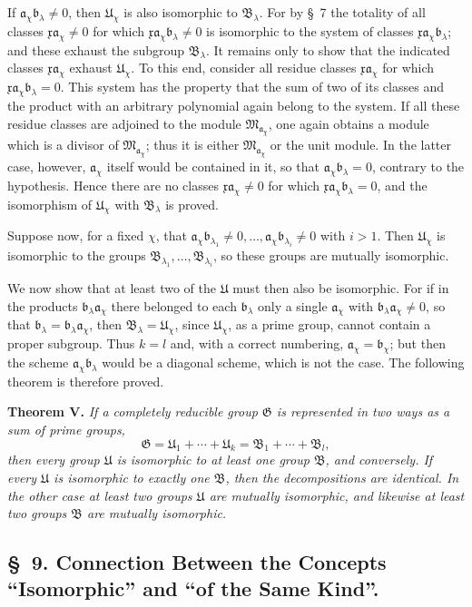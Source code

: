 \documentclass[11pt]{article}
\newcommand{\mM}{\mathfrak{M}}
\newcommand{\mG}{\mathfrak{G}}
\newcommand{\mB}{\mathfrak{B}}
\newcommand{\ma}{\mathfrak{a}}
\newcommand{\mb}{\mathfrak{b}}
\newcommand{\mx}{\mathfrak{x}}
\newcommand{\mU}{\mathfrak{U}}
\begin{document}
If $\ma_\chi\mb_\lambda\ne0$, then $\mU_\chi$ is also isomorphic to $\mB_\lambda$. For by \S~7 the totality of all classes $\mx\ma_\chi\ne0$ for which $\mx\ma_\chi\mb_\lambda\ne0$ is isomorphic to the system of classes $\mx\ma_\chi\mb_\lambda$; and these exhaust the subgroup $\mB_\lambda$. It remains only to show that the indicated classes $\mx\ma_\chi$ exhaust $\mU_\chi$. To this end, consider all residue classes $\mx\ma_\chi$ for which $\mx\ma_\chi\mb_\lambda=0$. This system has the property that the sum of two of its classes and the product with an arbitrary polynomial again belong to the system. If all these residue classes are adjoined to the module $\mM_{\ma_\chi}$, one again obtains a module which is a divisor of $\mM_{\ma_\chi}$; thus it is either $\mM_{\ma_\chi}$ or the unit module. In the latter case, however, $\ma_\chi$ itself would be contained in it, so that $\ma_\chi\mb_\lambda=0$, contrary to the hypothesis. Hence there are no classes $\mx\ma_\chi\ne0$ for which $\mx\ma_\chi\mb_\lambda=0$, and the isomorphism of $\mU_\chi$ with $\mB_\lambda$ is proved.

Suppose now, for a fixed $\chi$, that $\ma_\chi\mb_{\lambda_1}\ne0,
\ldots,\ma_\chi\mb_{\lambda_i}\ne0$ with $i>1$. Then $\mU_\chi$ is isomorphic to the groups $\mB_{\lambda_1},\ldots,\mB_{\lambda_i}$, so these groups are mutually isomorphic.

We now show that at least two of the $\mU$ must then also be isomorphic. For if in the products $\mb_\lambda\ma_\chi$ there belonged to each $\mb_\lambda$ only a single $\ma_\chi$ with $\mb_\lambda\ma_\chi\ne0$, so that $\mb_\lambda=\mb_\lambda\ma_\chi$, then $\mB_\lambda=\mU_\chi$, since $\mU_\chi$, as a prime group, cannot contain a proper subgroup. Thus $k=l$ and, with a correct numbering, $\ma_\chi=\mb_\chi$; but then the scheme $\ma_\chi\mb_\lambda$ would be a diagonal scheme, which is not the case. The following theorem is therefore proved.

\textbf{Theorem V.} \emph{If a completely reducible group $\mG$ is represented in two ways as a sum of prime groups,
\[
 \mG=\mU_1+\cdots+\mU_k=\mB_1+\cdots+\mB_l,
\]
then every group $\mU$ is isomorphic to at least one group $\mB$, and conversely. If every $\mU$ is isomorphic to exactly one $\mB$, then the decompositions are identical. In the other case at least two groups $\mU$ are mutually isomorphic, and likewise at least two groups $\mB$ are mutually isomorphic.}

\subsection*{\S~9. Connection Between the Concepts ``Isomorphic'' and ``of the Same Kind''.}
\end{document}
